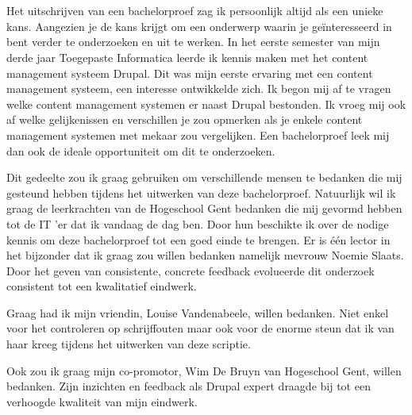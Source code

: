 
\chapter*{}
\label{ch:voorwoord}

Het uitschrijven van een bachelorproef zag ik persoonlijk altijd als een unieke kans. Aangezien je de kans krijgt om een onderwerp waarin je geïnteresseerd in bent verder te onderzoeken en uit te werken. In het eerste semester van mijn derde jaar Toegepaste Informatica leerde ik kennis maken met het content management systeem Drupal. Dit was mijn eerste ervaring met een content management systeem, een interesse ontwikkelde zich. Ik begon mij af te vragen welke content management systemen er naast Drupal bestonden. Ik vroeg mij ook af welke gelijkenissen en verschillen je zou opmerken als je enkele content management systemen met mekaar zou vergelijken. Een bachelorproef leek mij dan ook de ideale opportuniteit om dit te onderzoeken.

Dit gedeelte zou ik graag gebruiken om verschillende mensen te bedanken die mij gesteund hebben tijdens het uitwerken van deze bachelorproef. Natuurlijk wil ik graag de leerkrachten van de Hogeschool Gent bedanken die mij gevormd hebben tot de IT 'er dat ik vandaag de dag ben. Door hun beschikte ik over de nodige kennis om deze bachelorproef tot een goed einde te brengen. Er is één lector in het bijzonder dat ik graag zou willen bedanken namelijk mevrouw Noemie Slaats. Door het geven van consistente, concrete feedback evolueerde dit onderzoek consistent tot een kwalitatief eindwerk.

Graag had ik mijn vriendin, Louise Vandenabeele, willen bedanken. Niet enkel voor het controleren op schrijffouten maar ook voor de enorme steun dat ik van haar kreeg tijdens het uitwerken van deze scriptie.

Ook zou ik graag mijn co-promotor, Wim De Bruyn van Hogeschool Gent, willen bedanken. Zijn inzichten en feedback als Drupal expert draagde bij tot een verhoogde kwaliteit van mijn eindwerk.

